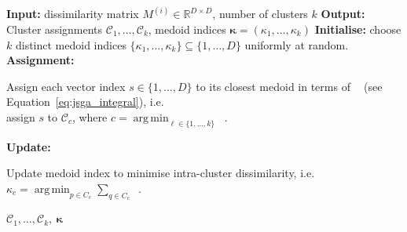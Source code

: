 \documentclass[12pt,compact]{article}
\DeclareMathOperator*{\argmin}{arg\,min}
\newcommand{\eJSGa}[1]{\mathop{\mathrm{eJS}_{i, #1}^{\mathrm{G}_{\lambda}}}\nolimits}
\DeclareRobustCommand{\eJSGai}{\mathop{\mathrm{eJS}^{\mathrm{G}_{\lambda}}}\nolimits}
\begin{document}
\begin{algorithm}[htb]
  \caption{Partitioning Around Medoids (PAM) algorithm using the $\eJSGai{}$ divergence.}
  \label{alg:kmedoids_kappa}
  \begin{algorithmic}[1]
    \State \textbf{Input:} dissimilarity matrix $M^{(i)}\in\mathbb{R}^{D\times D}$, number of clusters $k$
    \State \textbf{Output:} Cluster assignments $\mathcal{C}_1,\dots,\mathcal{C}_k$, medoid indices $\boldsymbol{\kappa}=(\kappa_1,\dots,\kappa_k)$
    \State \textbf{Initialise:} choose $k$ distinct medoid indices $\{\kappa_1,\dots,\kappa_k\}\subseteq\{1,\dots,D\}$ uniformly at random.
    \Repeat
    \State \textbf{Assignment:} \parbox[t]{.82\linewidth}{\raggedright Assign each vector index $s\in\{1,\dots,D\}$ to its closest medoid in terms of $\eJSGai{}$ (see Equation~\eqref{eq:jsga_integral}), i.e.\ \\ assign $s$ to $\mathcal{C}_c$, where $c = \argmin_{\ell\in\{1,\dots,k\}} \eJSGa{s,\kappa_\ell}$.}
        \State \textbf{Update:} \parbox[t]{.82\linewidth}{\raggedright Update medoid index to minimise intra-cluster dissimilarity, i.e.\ $\kappa_c = \argmin_{p\in C_c}\sum_{q\in C_c} \eJSGa{p,q}$.}
        \State {}
      \EndFor
    \State \Return $\mathcal{C}_1,\dots,\mathcal{C}_k,\ \boldsymbol{\kappa}$
  \end{algorithmic}
\end{algorithm}

\end{document}
